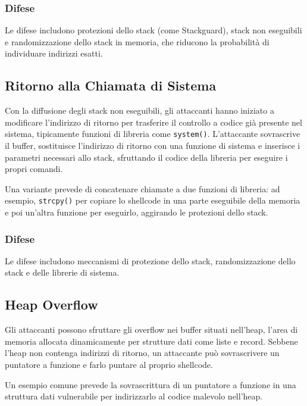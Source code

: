 \subsubsection{Difese}

Le difese includono protezioni dello stack (come Stackguard), stack non eseguibili e randomizzazione dello stack in memoria, che riducono la probabilità di individuare indirizzi esatti.

\subsection{Ritorno alla Chiamata di Sistema}

Con la diffusione degli stack non eseguibili, gli attaccanti hanno iniziato a modificare l'indirizzo di ritorno per trasferire il controllo a codice già presente nel sistema, tipicamente funzioni di libreria come \texttt{system()}. L'attaccante sovrascrive il buffer, sostituisce l'indirizzo di ritorno con una funzione di sistema e inserisce i parametri necessari allo stack, sfruttando il codice della libreria per eseguire i propri comandi.

Una variante prevede di concatenare chiamate a due funzioni di libreria: ad esempio, \texttt{strcpy()} per copiare lo shellcode in una parte eseguibile della memoria e poi un'altra funzione per eseguirlo, aggirando le protezioni dello stack.

\subsubsection{Difese}

Le difese includono meccanismi di protezione dello stack, randomizzazione dello stack e delle librerie di sistema.

\subsection{Heap Overflow}

Gli attaccanti possono sfruttare gli overflow nei buffer situati nell'heap, l'area di memoria allocata dinamicamente per strutture dati come liste e record. Sebbene l'heap non contenga indirizzi di ritorno, un attaccante può sovrascrivere un puntatore a funzione e farlo puntare al proprio shellcode.

Un esempio comune prevede la sovrascrittura di un puntatore a funzione in una struttura dati vulnerabile per indirizzarlo al codice malevolo nell'heap.

